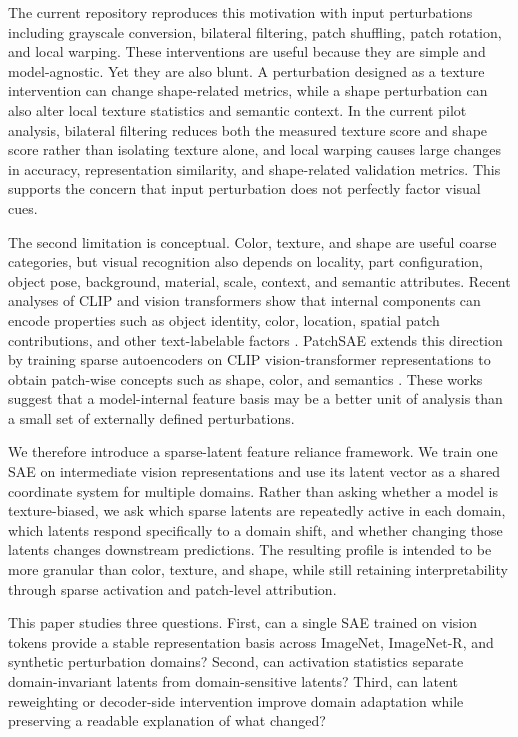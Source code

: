 \documentclass{article}
\begin{document}
The current repository reproduces this motivation with input perturbations including grayscale conversion, bilateral filtering, patch shuffling, patch rotation, and local warping. These interventions are useful because they are simple and model-agnostic. Yet they are also blunt. A perturbation designed as a texture intervention can change shape-related metrics, while a shape perturbation can also alter local texture statistics and semantic context. In the current pilot analysis, bilateral filtering reduces both the measured texture score and shape score rather than isolating texture alone, and local warping causes large changes in accuracy, representation similarity, and shape-related validation metrics. This supports the concern that input perturbation does not perfectly factor visual cues.

The second limitation is conceptual. Color, texture, and shape are useful coarse categories, but visual recognition also depends on locality, part configuration, object pose, background, material, scale, context, and semantic attributes. Recent analyses of CLIP and vision transformers show that internal components can encode properties such as object identity, color, location, spatial patch contributions, and other text-labelable factors \cite{gandelsman2024clipdecomposition}. PatchSAE extends this direction by training sparse autoencoders on CLIP vision-transformer representations to obtain patch-wise concepts such as shape, color, and semantics \cite{lim2025patchsae}. These works suggest that a model-internal feature basis may be a better unit of analysis than a small set of externally defined perturbations.

We therefore introduce a sparse-latent feature reliance framework. We train one SAE on intermediate vision representations and use its latent vector as a shared coordinate system for multiple domains. Rather than asking whether a model is texture-biased, we ask which sparse latents are repeatedly active in each domain, which latents respond specifically to a domain shift, and whether changing those latents changes downstream predictions. The resulting profile is intended to be more granular than color, texture, and shape, while still retaining interpretability through sparse activation and patch-level attribution.

This paper studies three questions. First, can a single SAE trained on vision tokens provide a stable representation basis across ImageNet, ImageNet-R, and synthetic perturbation domains? Second, can activation statistics separate domain-invariant latents from domain-sensitive latents? Third, can latent reweighting or decoder-side intervention improve domain adaptation while preserving a readable explanation of what changed?
\end{document}
